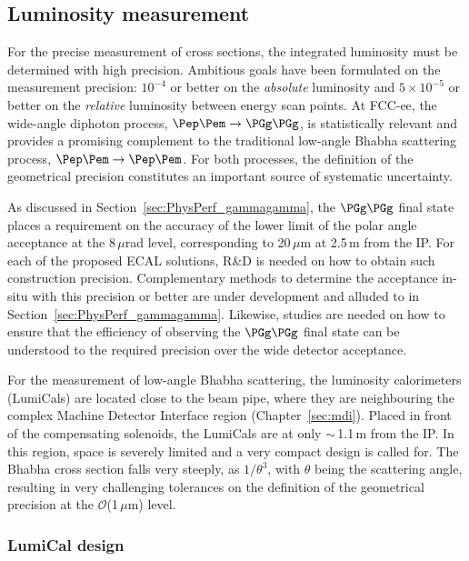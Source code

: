 \subsection{Luminosity measurement}
\label{sec:lumi}

For the precise measurement of cross sections, the integrated luminosity must be determined with high precision. 
Ambitious goals have been formulated on the measurement precision: 
$10^{-4}$ or better on the \emph{absolute} luminosity 
and $5 \times 10^{-5}$ or better on the \emph{relative} luminosity between energy scan points. 
At FCC-ee, the wide-angle diphoton process, $\epem \to \PGg\PGg$, is statistically relevant 
and provides a promising complement to the traditional low-angle Bhabha scattering process, $\epem \to \epem$.
For both processes, the definition of the geometrical precision constitutes an important source of systematic uncertainty.

As discussed in Section~\ref{sec:PhysPerf_gammagamma}, 
the $\PGg\PGg$ final state places a requirement on the accuracy of the lower limit of the polar angle acceptance at the 8\,$\mu$rad level, 
corresponding to 20\,$\mu$m at 2.5\,m from the IP. 
For each of the proposed ECAL solutions, R\&D is needed on how to obtain such construction precision. 
Complementary methods to determine the acceptance in-situ with this precision or better 
are under development and alluded to in Section~\ref{sec:PhysPerf_gammagamma}.
Likewise, studies are needed on how to ensure that the efficiency of observing the $\PGg\PGg$ final state 
can be understood to the required precision over the wide detector acceptance.

For the measurement of low-angle Bhabha scattering, 
the luminosity calorimeters (LumiCals) are located close to the beam pipe, 
where they are neighbouring the complex Machine Detector Interface region (Chapter~\ref{sec:mdi}). 
Placed in front of the compensating solenoids, the LumiCals are at only $\sim$\,1.1\,m from the IP. 
In this region, space is severely limited and a very compact design is called for. 
The Bhabha cross section falls very steeply, as $1/\theta^3$, with $\theta$ being the scattering angle, 
resulting in very challenging tolerances on the definition of the geometrical precision at the $\mathcal{O}$(1\,$\mu$m) level.

\subsubsection{LumiCal design}
\label{sec:LumiCal}

